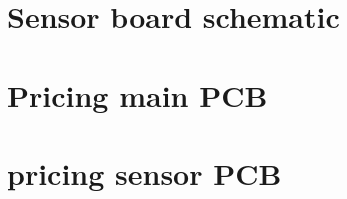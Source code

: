 \documentclass[11pt,a4paper]{article}
\begin{document}
\newpage

\section{Sensor board schematic}\label{app:sensorboard_schematic}

\newpage

\section{Pricing main PCB}\label{app:pricing main pcb}

\newpage

\section{pricing sensor PCB}\label{app:pricing sensor pcb}

\newpage
\end{document}
